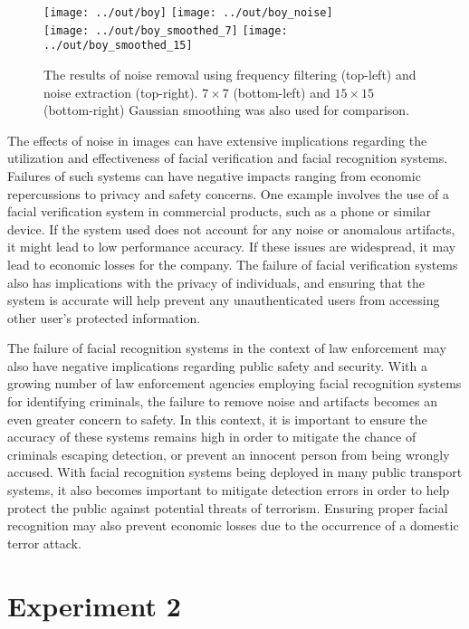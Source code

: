 \documentclass[headings=optiontoheadandtoc,listof=totoc,parskip=full]{scrartcl}
\begin{document}
\begin{figure}[H]
	\centering
	\texttt{[image: ../out/boy]}
	\quad
	\texttt{[image: ../out/boy\_noise]} \\[.5cm]
	\texttt{[image: ../out/boy\_smoothed\_7]}
	\quad
	\texttt{[image: ../out/boy\_smoothed\_15]}
	\caption{The results of noise removal using frequency filtering (top-left) and noise extraction (top-right). $7 \times 7$ (bottom-left) and $15 \times 15$ (bottom-right) Gaussian smoothing was also used for comparison.}
	\label{fig:boy}
\end{figure}

The effects of noise in images can have extensive implications regarding the utilization and effectiveness of facial verification and facial recognition systems. Failures of such systems can have negative impacts ranging from economic repercussions to privacy and safety concerns. One example involves the use of a facial verification system in commercial products, such as a phone or similar device. If the system used does not account for any noise or anomalous artifacts, it might lead to low performance accuracy. If these issues are widespread, it may lead to economic losses for the company. The failure of facial verification systems also has implications with the privacy of individuals, and ensuring that the system is accurate will help prevent any unauthenticated users from accessing other user’s protected information.

The failure of facial recognition systems in the context of law enforcement may also have negative implications regarding public safety and security. With a growing number of law enforcement agencies employing facial recognition systems for identifying criminals, the failure to remove noise and artifacts becomes an even greater concern to safety. In this context, it is important to ensure the accuracy of these systems remains high in order to mitigate the chance of criminals escaping detection, or prevent an innocent person from being wrongly accused. With facial recognition systems being deployed in many public transport systems, it also becomes important to mitigate detection errors in order to help protect the public against potential threats of terrorism. Ensuring proper facial recognition may also prevent economic losses due to the occurrence of a domestic terror attack.


\section{Experiment 2}
\label{sec:exp-2}
\end{document}
